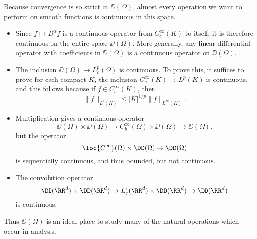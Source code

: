 Because convergence is so strict in $\DD(\Omega)$, almost every operation we want to perform on smooth functions is continuous in this space.
%
\begin{itemize}
    \item Since $f \mapsto D^\alpha f$ is a continuous operator from $C_c^\infty(K)$ to itself, it is therefore continuous on the entire space $\DD(\Omega)$. More generally, any linear differential operator with coefficients in $\DD(\Omega)$ is a continuous operator on $\DD(\Omega)$.

    \item The inclusion $\DD(\Omega) \to L^p_c(\Omega)$ is continuous. To prove this, it suffices to prove for each compact $K$, the inclusion $C_c^\infty(K) \to L^p(K)$ is continuous, and this follows because if $f \in C_c^\infty(K)$, then
    \[ \| f \|_{L^p(K)} \leq |K|^{1/p} \| f \|_{L^\infty(K)}. \]

    \item Multiplication gives a continuous operator
    \[ \DD(\Omega) \times \DD(\Omega) \to  C^\infty_b(\Omega) \times \DD(\Omega) \to \DD(\Omega). \]
    but the operator
    \[ \loc{C^\infty}(\Omega) \times \DD(\Omega) \to \DD(\Omega) \]
    is sequentially continuous, and thus bounded, but not continuous.

    \item The convolution operator
    \[ \DD(\RR^d) \times \DD(\RR^d) \to L^1_c(\RR^d) \times \DD(\RR^d) \to \DD(\RR^d) \]
    is continuous.
\end{itemize}
%
Thus $\DD(\Omega)$ is an ideal place to study many of the natural operations which occur in analysis.

